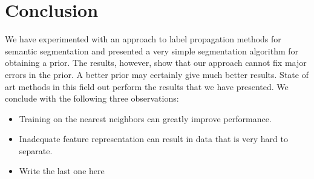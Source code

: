 \documentclass{article} %
\begin{document}

\section{Conclusion}
\label{sec:Conclusion}
We have experimented with an approach to label propagation methods for semantic segmentation and presented a very simple segmentation algorithm for obtaining a prior. The results, however, show that our approach cannot fix major errors in the prior. A better prior may certainly give much better results. State of art methods in this field out perform the results that we have presented. We conclude with the following three observations:
\begin{itemize}
\item Training on the nearest neighbors can greatly improve performance.
\item Inadequate feature representation can result in data that is very hard to separate.
\item Write the last one here
\end{itemize}



\end{document}
